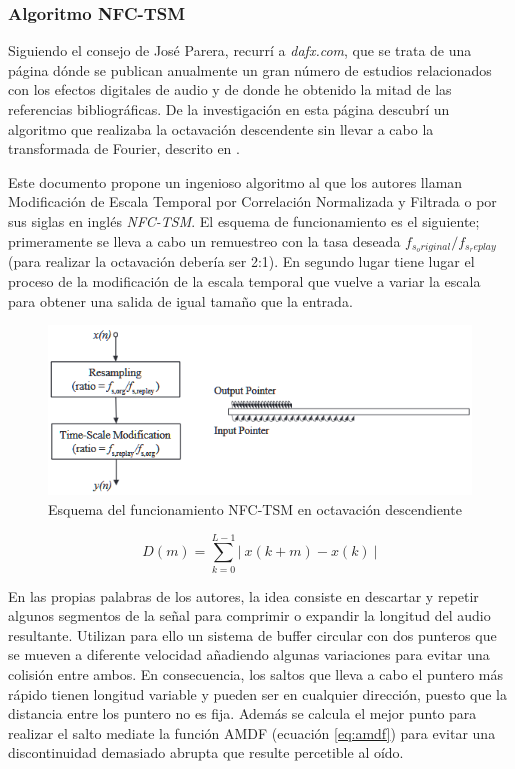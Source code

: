 \subsubsection{Algoritmo NFC-TSM}
Siguiendo el consejo de José Parera, recurrí a \emph{dafx.com}, que se trata de una página dónde se publican anualmente un gran número de estudios relacionados con los efectos digitales de audio y de donde he obtenido la mitad de las referencias bibliográficas. De la investigación en esta página descubrí un algoritmo que realizaba la octavación descendente sin llevar a cabo la transformada de Fourier, descrito en \cite{nfctsm}.

Este documento propone un ingenioso algoritmo al que los autores llaman Modificación de Escala Temporal por Correlación Normalizada y Filtrada o por sus siglas en inglés \emph{NFC-TSM}. El esquema de funcionamiento es el siguiente; primeramente se lleva a cabo un remuestreo con la tasa deseada $f_{s_original}/f_{s_replay}$ (para realizar la octavación debería ser 2:1). En segundo lugar tiene lugar el proceso de la modificación de la escala temporal que vuelve a variar la escala para obtener una salida de igual tamaño que la entrada.

\begin{figure}[!ht]
\begin{center}
\includegraphics[width=12cm]{img/nfc-tsm.png}
\caption{\label{fig:tsm}Esquema del funcionamiento NFC-TSM en octavación descendiente}
\end{center}
\end{figure}

\begin{equation}
\label{eq:amdf}
D(m) =  \sum_{k = 0}^{L - 1}|~x(k+m)-x(k)~|
\end{equation}

En las propias palabras de los autores, la idea consiste en descartar y repetir algunos segmentos de la señal para comprimir o expandir la longitud del audio resultante. Utilizan para ello un sistema de buffer circular con dos punteros que se mueven a diferente velocidad añadiendo algunas variaciones para evitar una colisión entre ambos. En consecuencia, los saltos que lleva a cabo el puntero más rápido tienen longitud variable y pueden ser en cualquier dirección, puesto que la distancia entre los puntero no es fija. Además se calcula el mejor punto para realizar el salto mediate la función AMDF (ecuación \ref{eq:amdf}) para evitar una discontinuidad demasiado abrupta que resulte percetible al oído. 

